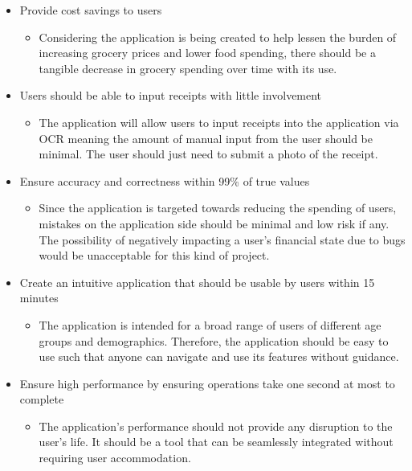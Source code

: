 \documentclass{article}
\begin{document}
\begin{itemize}
  \item Provide cost savings to users
  \begin{itemize}
    \item Considering the application is being created to help lessen the burden of increasing
    grocery prices and lower food spending, there should be a tangible decrease in grocery spending
    over time with its use.
  \end{itemize}
  \item Users should be able to input receipts with little involvement
  \begin{itemize}
    \item The application will allow users to input receipts into the application via OCR
    meaning the amount of manual input from the user should be minimal. The user should just need
    to submit a photo of the receipt.
  \end{itemize}
  \item Ensure accuracy and correctness within 99\% of true values
  \begin{itemize}
    \item Since the application is targeted towards reducing the spending of users, mistakes
    on the application side should be minimal and low risk if any. The possibility of negatively
    impacting a user's financial state due to bugs would be unacceptable for this kind of
    project.
  \end{itemize}  
  \item Create an intuitive application that should be usable by users within 15 minutes
  \begin{itemize}
    \item The application is intended for a broad range of users of different age groups
    and demographics. Therefore, the application should be easy to use such that anyone
    can navigate and use its features without guidance.
  \end{itemize}  
  \item Ensure high performance by ensuring operations take one second at most to complete
  \begin{itemize}
    \item The application's performance should not provide any disruption to the user's life.
    It should be a tool that  can be seamlessly integrated without requiring user
    accommodation.
  \end{itemize} 
\end{itemize}
\end{document}
